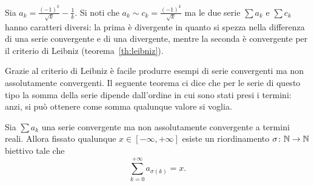\begin{exercise}
Sia $a_k = \frac{(-1)^k}{\sqrt k} - \frac{1}{k}$.
Si noti che $a_k \sim c_k = \frac{(-1)^k}{\sqrt k}$
ma le due serie $\sum a_k$ e $\sum c_k$ hanno caratteri diversi:
la prima è divergente in quanto si spezza nella differenza 
di una serie convergente e di una divergente,
mentre la seconda è convergente per il criterio di 
Leibniz (teorema~\ref{th:leibniz}).
\end{exercise}

Grazie al criterio di Leibniz è facile 
produrre esempi di serie convergenti
ma non assolutamente convergenti.
Il seguente teorema ci dice che per le serie di questo tipo 
la somma della serie dipende dall'ordine in cui sono stati presi i termini:
anzi, si può ottenere come somma qualunque valore si voglia.

\begin{theorem}%
\label{th:convergenza_condizionata}%
%
%
Sia $\sum a_k$ una serie convergente ma non assolutamente convergente a termini reali.
Allora fissato qualunque $x \in [-\infty , +\infty]$ esiste un riordinamento
$\sigma \colon {\mathbb N} \to {\mathbb N}$ biettivo tale che
\[
  \sum_{k=0}^{+\infty}  a_{\sigma(k)} = x.
\]
\end{theorem}
%
